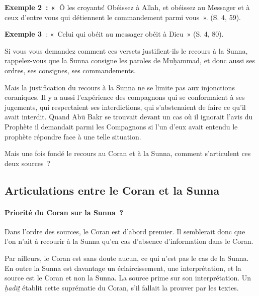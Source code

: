 
\textbf{Exemple 2~: «~}Ô les croyants! Obéissez à Allah, et obéissez au
Messager et à ceux d'entre vous qui détiennent le commandement parmi
vous~». (S. 4, 59).


\textbf{Exemple 3~}: «~Celui qui obéit au messager obéit à Dieu~» (S. 4,
80).


Si vous vous demandez comment ces versets justifient-ils le recours à la
Sunna, rappelez-vous que la Sunna consigne les paroles de Muḥammad, et
donc aussi ses ordres, ses consignes, ses commandements.

Mais la justification du recours à la Sunna ne se limite pas aux
injonctions coraniques. Il y a aussi l'expérience des compagnons qui se
conformaient à ses jugements, qui respectaient ses interdictions, qui
s'abstenaient de faire ce qu'il avait interdit. Quand Abū Bakr se
trouvait devant un cas où il ignorait l'avis du Prophète il demandait
parmi les Compagnons si l'un d'eux avait entendu le prophète répondre
face à une telle situation.

Mais une fois fondé le recours au Coran et à la Sunna, comment
s'articulent ces deux sources~?


\subsection{Articulations entre le Coran et la
Sunna}\label{articulations-entre-le-coran-et-la-sunna}


\paragraph{Priorité du Coran sur la
Sunna~?}\label{priorituxe9-du-coran-sur-la-sunna}

Dans l'ordre des sources, le Coran est d'abord premier. Il semblerait
donc que l'on n'ait à recourir à la Sunna qu'en cas d'absence
d'information dans le Coran.

Par ailleurs, le Coran est sans doute aucun, ce qui n'est pas le cas de
la Sunna. En outre la Sunna est davantage un éclaircissement, une
interprétation, et la source est le Coran et non la Sunna. La source
prime sur son interprétation. Un \emph{ḥadīṯ} établit cette suprématie
du Coran, s'il fallait la prouver par les textes.

